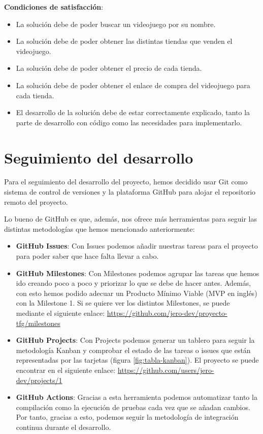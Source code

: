 \textbf{Condiciones de satisfacción}:

\begin{itemize}
    \item La solución debe de poder buscar un videojuego por su nombre.
    \item La solución debe de poder obtener las distintas tiendas que venden el 
    videojuego.
    \item La solución debe de poder obtener el precio de cada tienda.
    \item La solución debe de poder obtener el enlace de compra del videojuego para 
    cada tienda.
    \item El desarrollo de la solución debe de estar correctamente explicado, tanto 
    la parte de desarrollo con código como las necesidades para implementarlo.
\end{itemize}

\section{Seguimiento del desarrollo}

Para el seguimiento del desarrollo del proyecto, hemos decidido usar Git como 
sistema de control de versiones y la plataforma GitHub para alojar el repositorio 
remoto del proyecto.

Lo bueno de GitHub es que, además, nos ofrece más herramientas para seguir las 
distintas metodologías que hemos mencionado anteriormente:

\begin{itemize}
    \item \textbf{GitHub Issues}: Con Issues podemos añadir nuestras tareas para el 
    proyecto para poder saber que hace falta llevar a cabo.
    \item \textbf{GitHub Milestones}: Con Milestones podemos agrupar las tareas que 
    hemos ido creando poco a poco y priorizar lo que se debe de hacer antes. 
    Además, con esto hemos podido adecuar un Producto Mínimo Viable (MVP en inglés) 
    con la Milestone 1. Si se quiere ver los distintos Milestones, se puede 
    mediante el siguiente enlace: 
    \url{https://github.com/jero-dev/proyecto-tfg/milestones}
    \item \textbf{GitHub Projects}: Con Projects podemos generar un tablero para 
    seguir la metodología Kanban y comprobar el estado de las tareas o issues que 
    están representadas por las tarjetas (figura \ref{fig:tabla-kanban}). El 
    proyecto se puede encontrar en el siguiente enlace: 
    \url{https://github.com/users/jero-dev/projects/1}
    \item \textbf{GitHub Actions}: Gracias a esta herramienta podemos automatizar 
    tanto la compilación como la ejecución de pruebas cada vez que se añadan 
    cambios. Por tanto, gracias a esto, podemos seguir la metodología de 
    integración continua durante el desarrollo.
\end{itemize}
